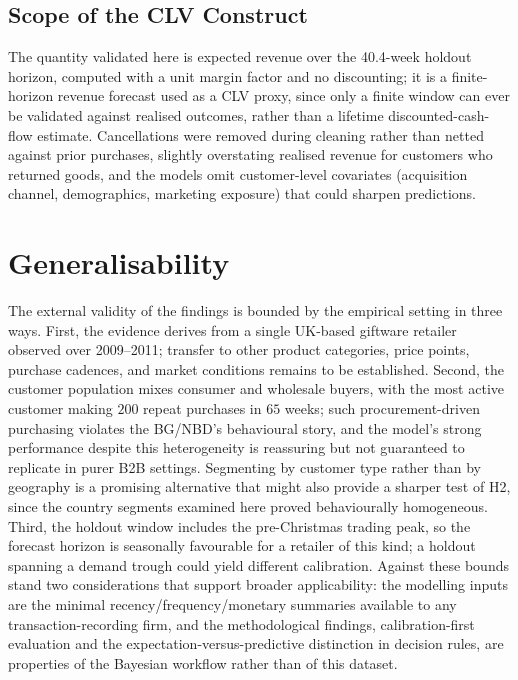 \subsection{Scope of the CLV Construct}
\label{sec:limitations-construct}

The quantity validated here is expected revenue over the \num{40.4}-week holdout horizon, computed with a unit margin factor and no discounting; it is a finite-horizon revenue forecast used as a CLV proxy, since only a finite window can ever be validated against realised outcomes, rather than a lifetime discounted-cash-flow estimate. Cancellations were removed during cleaning rather than netted against prior purchases, slightly overstating realised revenue for customers who returned goods, and the models omit customer-level covariates (acquisition channel, demographics, marketing exposure) that could sharpen predictions.

\section{Generalisability}
\label{sec:generalisability}

The external validity of the findings is bounded by the empirical setting in three ways. First, the evidence derives from a single UK-based giftware retailer observed over 2009--2011; transfer to other product categories, price points, purchase cadences, and market conditions remains to be established. Second, the customer population mixes consumer and wholesale buyers, with the most active customer making $200$ repeat purchases in $65$ weeks; such procurement-driven purchasing violates the BG/NBD's behavioural story, and the model's strong performance despite this heterogeneity is reassuring but not guaranteed to replicate in purer B2B settings. Segmenting by customer type rather than by geography is a promising alternative that might also provide a sharper test of H2, since the country segments examined here proved behaviourally homogeneous. Third, the holdout window includes the pre-Christmas trading peak, so the forecast horizon is seasonally favourable for a retailer of this kind; a holdout spanning a demand trough could yield different calibration. Against these bounds stand two considerations that support broader applicability: the modelling inputs are the minimal recency/frequency/monetary summaries available to any transaction-recording firm, and the methodological findings, calibration-first evaluation and the expectation-versus-predictive distinction in decision rules, are properties of the Bayesian workflow rather than of this dataset.

